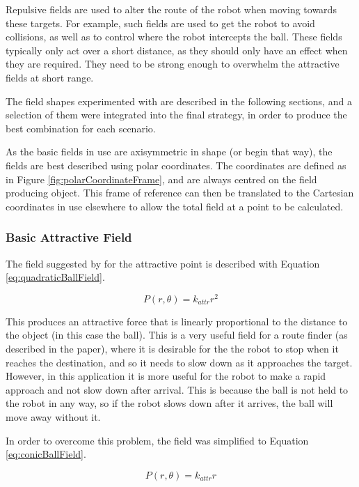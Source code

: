 \documentclass[10pt]{article}
\begin{document}
Repulsive fields are used to alter the route of the robot when moving towards
these targets. For example, such fields are used to get the robot to avoid
collisions, as well as to control where the robot intercepts the ball. These
fields typically only act over a short distance, as they should only have an
effect when they are required. They need to be strong enough to overwhelm the
attractive fields at short range.

The field shapes experimented with are described in the following sections, and
a selection of them were integrated into the final strategy, in order to produce
the best combination for each scenario.

As the basic fields in use are axisymmetric in shape (or begin that way), the
fields are best described using polar coordinates. The coordinates are defined
as in Figure \ref{fig:polarCoordinateFrame}, and are always centred on the field
producing object. This frame of reference can then be translated to the
Cartesian coordinates in use elsewhere to allow the total field at a point to be
calculated.

\subsubsection{Basic Attractive Field\label{sub:Basic-Attractive-Field}}

The field suggested by \cite{intelligentAlgorithmPathPlanning} for the
attractive point is described with Equation \ref{eq:quadraticBallField}.

\begin{equation}
P(r,\theta)=k_{attr}r^{2}\label{eq:quadraticBallField}
\end{equation}

This produces an attractive force that is linearly proportional to the distance
to the object (in this case the ball). This is a very useful field for a route
finder (as described in the paper), where it is desirable for the the robot to
stop when it reaches the destination, and so it needs to slow down as it
approaches the target. However, in this application it is more useful for the
robot to make a rapid approach and not slow down after arrival. This is because
the ball is not held to the robot in any way, so if the robot slows down after
it arrives, the ball will move away without it.

In order to overcome this problem, the field was simplified to Equation
\ref{eq:conicBallField}.

\begin{equation}
P(r,\theta)=k_{attr}r\label{eq:conicBallField}
\end{equation}
\end{document}
